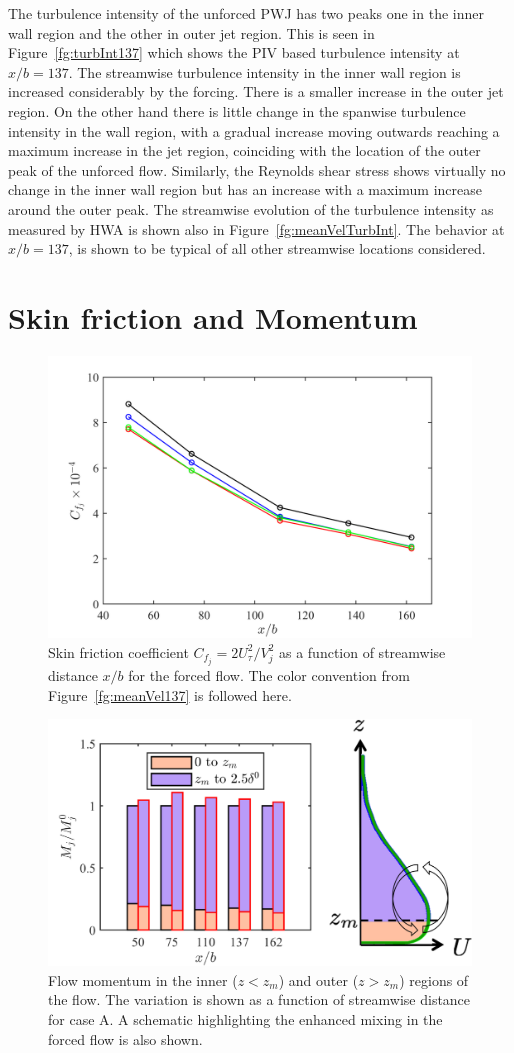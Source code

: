 The turbulence intensity of the unforced PWJ has two peaks one in the inner wall region and the other in outer jet region. This is seen in Figure~\ref{fg:turbInt137} which shows the PIV based turbulence intensity at $x/b=137$. The streamwise turbulence intensity in the inner wall region is increased considerably by the forcing. There is a smaller increase in the outer jet region. On the other hand there is little change in the spanwise turbulence intensity in the wall region, with a gradual increase moving outwards reaching a maximum increase in the jet region, coinciding with the location of the outer peak of the unforced flow. Similarly, the Reynolds shear stress shows virtually no change in the inner wall region but has an increase with a maximum increase around the outer peak. The streamwise evolution of the turbulence intensity as measured by HWA is shown also in Figure~\ref{fg:meanVelTurbInt}. The behavior at $x/b=137$, is shown to be typical of all other streamwise locations considered.

\section{Skin friction and Momentum}

\begin{figure}[h!]
	\centering
	\includegraphics[width=.65\textwidth]{pics/Cfj.png}
	\caption{Skin friction coefficient $C_{f_j} = 2U_{\tau}^2 / V_j^2$ as a function of  streamwise distance $x/b$ for the forced flow. The color convention from Figure~\ref{fg:meanVel137} is followed here.}
	\label{fg:cfj}
\end{figure}


\begin{figure}[h!]
	\centering
	\includegraphics[width=.65\textwidth]{pics/momentum.png}
	\caption{Flow momentum in the inner ($z<z_m$) and outer ($z>z_m$) regions of the flow. The variation is shown as a function of streamwise distance for case A. A schematic highlighting the enhanced mixing in the forced flow is also shown. }
	\label{fg:mom}
\end{figure}

